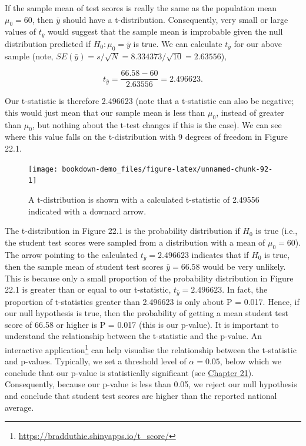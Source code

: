 \documentclass[
]{scrbook}
\begin{document}
If the sample mean of test scores is really the same as the population mean \(\mu_{0} = 60\), then \(\bar{y}\) should have a t-distribution.
Consequently, very small or large values of \(t_{\bar{y}}\) would suggest that the sample mean is improbable given the null distribution predicted if \(H_{0}: \mu_{0} = \bar{y}\) is true.
We can calculate \(t_{\bar{y}}\) for our above sample (note, \(SE(\bar{y}) = s/\sqrt{N} = 8.334373 / \sqrt{10} = 2.63556\)),

\[t_{\bar{y}} = \frac{66.58 - 60}{2.63556} = 2.496623.\]

Our t-statistic is therefore 2.496623 (note that a t-statistic can also be negative; this would just mean that our sample mean is less than \(\mu_{0}\), instead of greater than \(\mu_{0}\), but nothing about the t-test changes if this is the case).
We can see where this value falls on the t-distribution with 9 degrees of freedom in Figure 22.1.

\begin{figure}
\texttt{[image: bookdown-demo\_files/figure-latex/unnamed-chunk-92-1]} \caption{A t-distribution is shown with a calculated t-statistic of 2.49556 indicated with a downard arrow.}\label{fig:unnamed-chunk-92}
\end{figure}

The t-distribution in Figure 22.1 is the probability distribution if \(H_{0}\) is true (i.e., the student test scores were sampled from a distribution with a mean of \(\mu_{0} = 60\)).
The arrow pointing to the calculated \(t_{\bar{y}} = 2.496623\) indicates that if \(H_{0}\) is true, then the sample mean of student test scores \(\bar{y} = 66.58\) would be very unlikely.
This is because only a small proportion of the probability distribution in Figure 22.1 is greater than or equal to our t-statistic, \(t_{\bar{y}} = 2.496623\).
In fact, the proportion of t-statistics greater than 2.496623 is only about P = 0.017.
Hence, if our null hypothesis is true, then the probability of getting a mean student test score of 66.58 or higher is P = 0.017 (this is our p-value).
It is important to understand the relationship between the t-statistic and the p-value.
An interactive application\footnote{\url{https://bradduthie.shinyapps.io/t_score/}} can help visualise the relationship between the t-statistic and p-values.
Typically, we set a threshold level of \(\alpha = 0.05\), below which we conclude that our p-value is statistically significant (see \protect\hyperlink{Chapter_21}{Chapter 21}).
Consequently, because our p-value is less than 0.05, we reject our null hypothesis and conclude that student test scores are higher than the reported national average.
\end{document}
